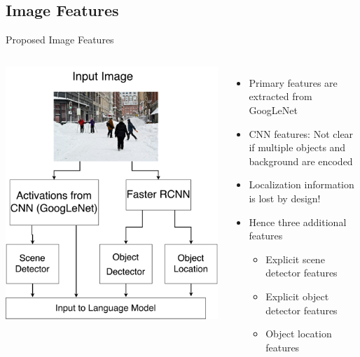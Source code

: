 \documentclass{beamer}
\begin{document}
\subsection{Image Features}
\begin{frame}{Proposed Image Features}
    \begin{columns}
    \centering
    \includegraphics[width=1.0\textwidth]{images/ImageFeatures.pdf}
    \hspace{-5mm}\begin{itemize}
        \item Primary features are extracted from GoogLeNet
        \item CNN features: Not clear if multiple objects and background are encoded 
        \item Localization information is lost by design! 
        \item Hence three additional features 
           \begin{itemize}
               \item Explicit scene detector features 
               \item Explicit object detector features
               \item Object location features 
           \end{itemize}
    \end{itemize}
    \end{columns}
\end{frame}
\end{document}
